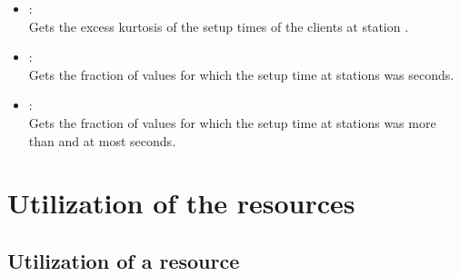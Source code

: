 \begin{itemize}
\item
{}:\\
Gets the excess kurtosis of the setup times of the clients at station . 

\item
{}:\\
Gets the fraction of values for which the setup time at stations  was  seconds.

\item
{}:\\
Gets the fraction of values for which the setup time at stations  was more than  and at most  seconds.

\end{itemize}



\section{Utilization of the resources}



\subsection{Utilization of a resource}

